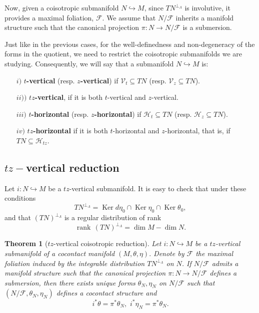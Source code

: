\documentclass[12pt]{article}
\newtheorem{theorem}{Theorem}[section]
\renewcommand{\dim}{\operatorname{dim}}
\renewcommand{\ker}{\operatorname{Ker}}
\begin{document}
Now, given a coisotropic submanifold $N \hookrightarrow M$, since $TN^{\perp_\Lambda}$ is involutive, it provides a maximal foliation, $\mathcal{F}$. We assume that $N/\mathcal{F}$ inherits a manifold structure such that the canonical projection $\pi: N \rightarrow N/\mathcal{F}$ is a submersion.

Just like in the previous cases, for the well-definedness and non-degeneracy of the forms in the quotient, we need to restrict the coisotropic submanifolds we are studying. Consequently, we will say that a submanifold $N \hookrightarrow M$ is:
\begin{itemize}
    \item[$i)$] \textbf{$t$-vertical} (resp. \textbf{$z$-vertical}) if $\mathcal{V}_t\subseteq TN$ (resp. $\mathcal{V}_z\subseteq TN$).
    \item[$ii))$] \textbf{$tz$-vertical}, if it is both $t$-vertical and $z$-vertical.
    \item[$iii)$] \textbf{$t$-horizontal} (resp. \textbf{$z$-horizontal}) if $\mathcal{H}_t \subseteq TN$ (resp. $\mathcal{H}_z \subseteq TN$).
    \item[$iv)$] \textbf{$tz$-horizontal} if it is both $t$-horizontal and $z$-horizontal, that is, if $TN \subseteq \mathcal{H}_{tz}$.
\end{itemize}

\subsection{\texorpdfstring{$tz-$}-vertical reduction}
Let $i: N \hookrightarrow M$ be a $tz$-vertical submanifold. It is easy to check that under these conditions $$TN^{\perp_\Lambda} = \ker  d\eta_0 \cap \ker \eta_0 \cap \ker \theta_0,$$ and that $(TN)^{\perp_\Lambda}$ is a regular distribution of rank $$\operatorname{rank}\, (TN)^{\perp_\Lambda} = \dim M - \dim N.
$$
\begin{theorem}[$tz$-vertical coisotropic reduction] Let $i: N \hookrightarrow M$ be a $tz$-vertical submanifold of a cocontact manifold $(M, \theta, \eta).$ Denote by $\mathcal{F}$ the maximal foliation induced by the integrable distribution $TN^{\perp_\Lambda}$ on $N$. If $N/\mathcal{F}$ admits a manifold structure such that the canonical projection $\pi: N \rightarrow N/\mathcal{F}$ defines a submersion, then there exists unique forms $\theta_N, \eta_N$ on $N/\mathcal{F}$ such that $(N/\mathcal{F}, \theta_N, \eta_N)$ defines a cocontact structure and $$i^*\theta = \pi^*\theta_N, \,\, i^*\eta_N = \pi^*\theta_N.$$
\end{theorem}
\end{document}
